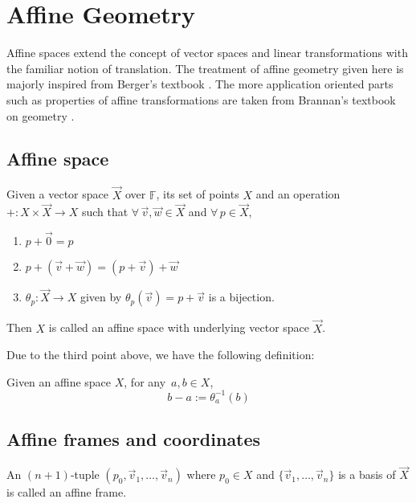 \chapter{Affine Geometry}

Affine spaces extend the concept of vector spaces and linear transformations with
the familiar notion of translation. The treatment of affine geometry given here
is majorly inspired from Berger's textbook \cite{berger}. The more application
oriented parts such as properties of affine transformations are taken from
Brannan's textbook on geometry \cite{brannan}.

\section{Affine space}

\begin{definition}
    Given a vector space $\vec{X}$ over $\mathbb{F}$, its set of points $X$ and
    an operation $+: X\times\vec{X} \to X$ such that $\forall\,\vec{v},\vec{w}\in\vec{X}$
    and $\forall\,p\in\vec{X}$,
    \begin{enumerate}
        \item $p + \vec{0} = p$
        \item $p + (\vec{v} + \vec{w}) = (p + \vec{v}) + \vec{w}$
        \item $\theta_{p} : \vec{X} \to X$ given by
            $\theta_{p}(\vec{v}) = p + \vec{v}$ is a bijection.
    \end{enumerate}
    Then $X$ is called an affine space with underlying vector space $\vec{X}$.
\end{definition}

\noindent
Due to the third point above, we have the following definition:

\begin{definition}
    Given an affine space $X$, for any $\,a,b \in X$,
    \[ b - a := \theta_a^{-1}(b) \]
\end{definition}

\section{Affine frames and coordinates}

\begin{definition}
    An $(n+1)$-tuple $(p_0,\vec{v}_1,\dots,\vec{v}_n)$ where $p_0 \in X$ and
    $\{\vec{v}_1,\dots,\vec{v}_n\}$ is a basis of $\vec{X}$ is called an affine
    frame.
\end{definition}

